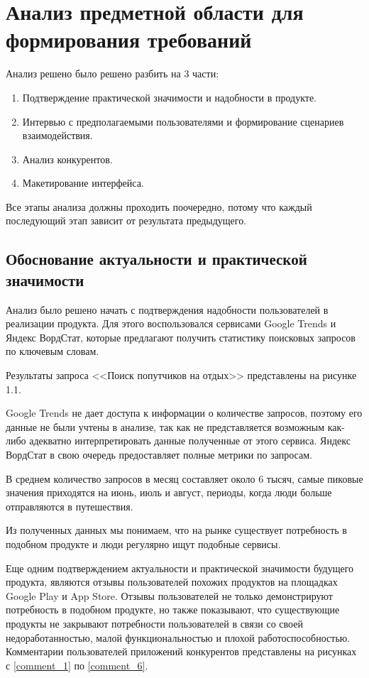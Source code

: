 \section{Анализ предметной области для формирования требований}

Анализ решено было решено разбить на 3 части:
\begin{enumerate}
    \item Подтверждение практической значимости и надобности в продукте.
    \item Интервью с предполагаемыми пользователями и формирование сценариев взаимодействия.
    \item Анализ конкурентов.
    \item Макетирование интерфейса.
\end{enumerate}

Все этапы анализа должны проходить поочередно, потому что каждый последующий этап зависит от результата предыдущего.

\subsection{Обоснование актуальности и практической значимости}
Анализ было решено начать с подтверждения надобности пользователей в реализации продукта. Для этого воспользовался сервисами Google Trends и Яндекс ВордСтат, которые предлагают получить статистику поисковых запросов по ключевым словам.

Результаты запроса <<Поиск попутчиков на отдых>> представлены на рисунке 1.1.


Google Trends не дает доступа к информации о количестве запросов, поэтому его данные не были учтены в анализе, так как не представляется возможным как-либо адекватно интерпретировать данные полученные от этого сервиса. Яндекс ВордСтат в свою очередь предоставляет полные метрики по запросам.

В среднем количество запросов в месяц составляет около 6 тысяч, самые пиковые значения приходятся на июнь, июль и август, периоды, когда люди больше отправляются в путешествия.

Из полученных данных мы понимаем, что на рынке существует потребность в подобном продукте и люди регулярно ищут подобные сервисы.

Еще одним подтверждением актуальности и практической значимости  будущего продукта, являются отзывы пользователей похожих продуктов на площадках Google Play и App Store. Отзывы пользователей не только демонстрируют потребность в подобном продукте, но также показывают, что существующие продукты не закрывают потребности пользователей в связи со своей недоработанностью, малой функциональностью и плохой работоспособностью. Комментарии пользователей приложений конкурентов представлены на рисунках с \ref{comment_1} по \ref{comment_6}.

